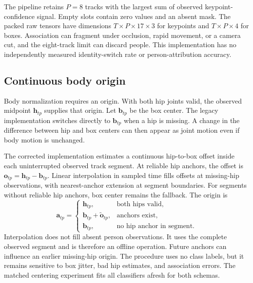 The pipeline retains $P=8$ tracks with the largest sum of observed keypoint-confidence signal. Empty slots contain zero values and an absent mask. The packed raw tensors have dimensions $T\times P\times17\times3$ for keypoints and $T\times P\times4$ for boxes. Association can fragment under occlusion, rapid movement, or a camera cut, and the eight-track limit can discard people. This implementation has no independently measured identity-switch rate or person-attribution accuracy.

\subsection{Continuous body origin}
Body normalization requires an origin. With both hip joints valid, the observed midpoint $\mathbf{h}_{tp}$ supplies that origin. Let $\mathbf{b}_{tp}$ be the box center. The legacy implementation switches directly to $\mathbf{b}_{tp}$ when a hip is missing. A change in the difference between hip and box centers can then appear as joint motion even if body motion is unchanged.

The corrected implementation estimates a continuous hip-to-box offset inside each uninterrupted observed track segment. At reliable hip anchors, the offset is $\mathbf{o}_{tp}=\mathbf{h}_{tp}-\mathbf{b}_{tp}$. Linear interpolation in sampled time fills offsets at missing-hip observations, with nearest-anchor extension at segment boundaries. For segments without reliable hip anchors, box center remains the fallback. The origin is
\begin{equation}
\mathbf{a}_{tp}=
\begin{cases}
\mathbf{h}_{tp}, & \text{both hips valid},\\
\mathbf{b}_{tp}+\widetilde{\mathbf{o}}_{tp}, & \text{anchors exist},\\
\mathbf{b}_{tp}, & \text{no hip anchor in segment}.
\end{cases}
\label{eq:center}
\end{equation}
Interpolation does not fill absent person observations. It uses the complete observed segment and is therefore an offline operation. Future anchors can influence an earlier missing-hip origin. The procedure uses no class labels, but it remains sensitive to box jitter, bad hip estimates, and association errors. The matched centering experiment fits all classifiers afresh for both schemas.

